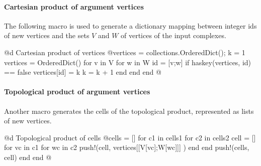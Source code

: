 \paragraph{Cartesian product of argument vertices}
The following macro is used to generate a dictionary mapping between integer ids of new vertices and the sets $V$ and $W$ of vertices of the input complexes.

@d Cartesian product of vertices  
@{vertices = collections.OrderedDict(); 
k = 1
vertices = OrderedDict()
for v in V
    for w in W
        id = [v;w]
        if haskey(vertices, id) == false
            vertices[id] = k
            k = k + 1
        end
    end
end
@}


\paragraph{Topological product of argument vertices}
Another macro generates the cells of the topological product, represented as lists of new vertices. 

@d Topological product of cells    
@{cells = []
for c1 in cells1
    for c2 in cells2
        cell = []
        for vc in c1
            for wc in c2 
                push!(cell, vertices[[V[vc];W[wc]]] )
            end
        end
        push!(cells, cell)
    end
end
@}

